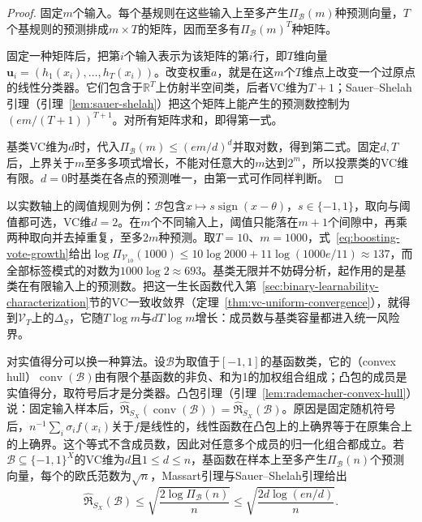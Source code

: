\begin{proof}
固定$m$个输入。每个基规则在这些输入上至多产生$\Pi_{\mathcal B}(m)$种预测向量，$T$个基规则的预测排成$m\times T$的矩阵，因而至多有$\Pi_{\mathcal B}(m)^T$种矩阵。

固定一种矩阵后，把第$i$个输入表示为该矩阵的第$i$行，即$T$维向量$\bm u_i=(h_1(x_i),\ldots,h_T(x_i))$。改变权重$a$，就是在这$m$个$T$维点上改变一个过原点的线性分类器。它们包含于$\mathbb R^T$上仿射半空间类，后者VC维为$T+1$；Sauer--Shelah引理（引理~\ref{lem:sauer-shelah}）把这个矩阵上能产生的预测数控制为$(em/(T+1))^{T+1}$。对所有矩阵求和，即得第一式。

基类VC维为$d$时，代入$\Pi_{\mathcal B}(m)\leq(em/d)^d$并取对数，得到第二式。固定$d,T$后，上界关于$m$至多多项式增长，不能对任意大的$m$达到$2^m$，所以投票类的VC维有限。$d=0$时基类在各点的预测唯一，由第一式可作同样判断。
\end{proof}

以实数轴上的阈值规则为例：$\mathcal B$包含$x\mapsto s\operatorname{sign}(x-\theta)$，$s\in\{-1,1\}$，取向与阈值都可选，VC维$d=2$。在$m$个不同输入上，阈值只能落在$m+1$个间隙中，再乘两种取向并去掉重复，至多$2m$种预测。取$T=10$、$m=1000$，式~\eqref{eq:boosting-vote-growth}给出$\log\Pi_{\mathcal V_{10}}(1000)\leq10\log2000+11\log(1000e/11)\approx137$，而全部标签模式的对数为$1000\log2\approx693$。基类无限并不妨碍分析，起作用的是基类在有限输入上的预测数。把这一生长函数代入第~\ref{sec:binary-learnability-characterization}节的VC一致收敛界（定理~\ref{thm:vc-uniform-convergence}），就得到$\mathcal V_T$上的$\Delta_S$，它随$T\log m$与$d T\log m$增长：成员数与基类容量都进入统一风险界。

对实值得分可以换一种算法。设$\mathcal B$为取值于$[-1,1]$的基函数类，它的（convex hull）$\operatorname{conv}(\mathcal B)$由有限个基函数的非负、和为1的加权组合组成；凸包的成员是实值得分，取符号后才是分类器。凸包引理（引理~\ref{lem:rademacher-convex-hull}）说：固定输入样本后，$\widehat{\mathfrak R}_{S_X}(\operatorname{conv}(\mathcal B))=\widehat{\mathfrak R}_{S_X}(\mathcal B)$。原因是固定随机符号后，$n^{-1}\sum_i\sigma_if(x_i)$关于$f$是线性的，线性函数在凸包上的上确界等于在原集合上的上确界。这个等式不含成员数，因此对任意多个成员的归一化组合都成立。若$\mathcal B\subseteq\{-1,1\}^X$的VC维为$d$且$1\leq d\leq n$，基函数在样本上至多产生$\Pi_{\mathcal B}(n)$个预测向量，每个的欧氏范数为$\sqrt n$，Massart引理与Sauer--Shelah引理给出
\begin{equation}
 \widehat{\mathfrak R}_{S_X}(\mathcal B)
 \leq\sqrt{\frac{2\log\Pi_{\mathcal B}(n)}{n}}
 \leq\sqrt{\frac{2d\log(en/d)}{n}}.
 \label{eq:ensemble-base-rademacher}
\end{equation}

